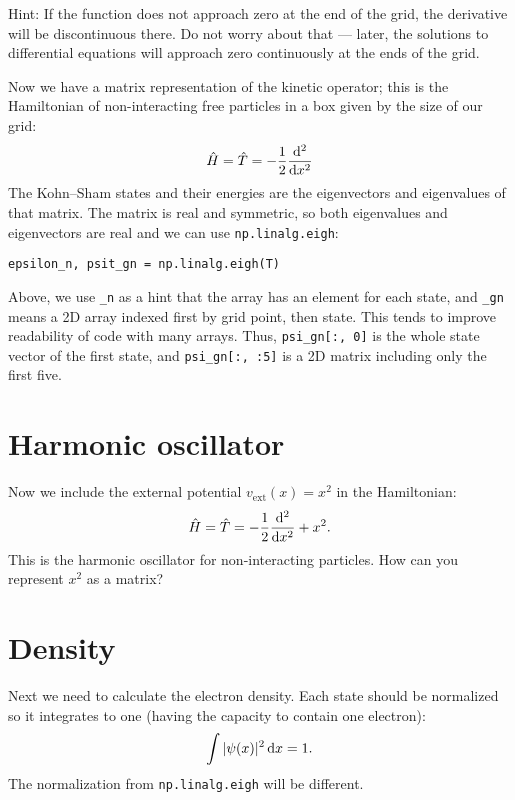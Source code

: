 \documentclass{article}
\begin{document}
Hint: If the function does not approach zero at the end of the grid, the derivative will be discontinuous there.  Do not worry about that --- later, the solutions to differential equations will approach zero continuously at the ends of the grid.

\noindent Now we have a matrix representation of the kinetic operator; this
is the Hamiltonian of non-interacting free particles in a box given by
the size of our grid:
\begin{align}
  \hat H = \hat T = -\frac12 \frac{\mathrm d ^2}{\mathrm d x^2}
\end{align}
The Kohn--Sham states and their energies are the eigenvectors and
eigenvalues of that matrix.  The matrix is real and symmetric, so both eigenvalues and eigenvectors are real and we can use
\texttt{np.linalg.eigh}:
\begin{lstlisting}
epsilon_n, psit_gn = np.linalg.eigh(T)
\end{lstlisting}
Above, we use \lstinline{_n} as a hint that the array has an element for each
state,
and \lstinline{_gn} means a 2D array indexed first by grid point, then state.
This tends to improve readability of code with many arrays.
Thus, \lstinline{psi_gn[:, 0]} is the whole state vector of the first state,
and \lstinline{psi_gn[:, :5]} is a 2D matrix including only the first five.


\section*{Harmonic oscillator}
Now we include the external potential $v_{\mathrm{ext}}(x) = x^2$ in the Hamiltonian:
\begin{align}
  \hat H = \hat T = -\frac12 \frac{\mathrm d ^2}{\mathrm d x^2} + x^2.
\end{align}
This is the harmonic oscillator for non-interacting particles.
How can you represent $x^2$ as a matrix?



\section*{Density}
Next we need to calculate the electron density.
Each state should be normalized so it integrates to one (having the
capacity to contain one electron):
\begin{align}
  \int |\psi(x)|^2 \,\mathrm d x = 1.
\end{align}
The normalization from \texttt{np.linalg.eigh} will be different.
\end{document}
